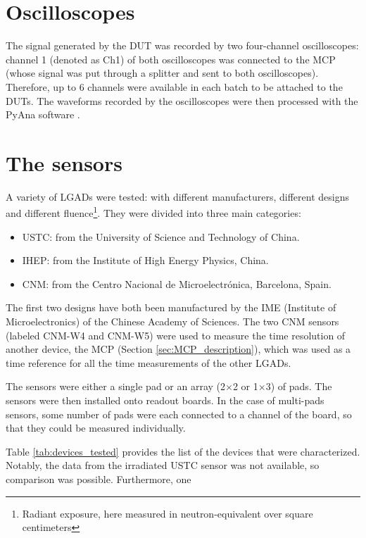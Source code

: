 \section{Oscilloscopes}
The signal generated by the DUT was recorded by two four-channel oscilloscopes: channel 1 (denoted as Ch1) of both oscilloscopes was connected to the MCP (whose signal was put through a splitter and sent to both oscilloscopes). Therefore, up to 6 channels were available in each batch to be attached to the DUTs.
The waveforms recorded by the oscilloscopes were then processed with the PyAna software \cite{atlas_hgtd_pyana_2025}. 


\section{The sensors}\label{sec:the_sensors}
A variety of LGADs were tested: with different manufacturers, different designs and different fluence\footnote{Radiant exposure, here measured in neutron-equivalent over square centimeters}. They were divided into three main categories:
\begin{itemize}
    \item USTC: from the University of Science and Technology of China.
    \item IHEP: from the Institute of High Energy Physics, China.
    \item CNM: from the Centro Nacional de Microelectr\'onica, Barcelona, Spain.
\end{itemize}

The first two designs have both been manufactured by the IME (Institute of Microelectronics) of the Chinese Academy of Sciences. The two CNM sensors (labeled CNM-W4 and CNM-W5) were used to measure the time resolution of another device, the MCP (Section \ref{sec:MCP_description}), which was used as a time reference for all the time measurements of the other LGADs. 

The sensors were either a single pad or an array (2\(\times\)2 or 1\(\times\)3) of pads. The sensors were then installed onto readout boards. In the case of multi-pads sensors, some number of pads were each connected to a channel of the board, so that they could be measured individually.

Table \ref{tab:devices_tested} provides the list of the devices that were characterized. Notably, the data from the irradiated USTC sensor was not available, so comparison was possible. Furthermore, one 

